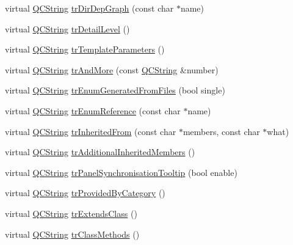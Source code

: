 \begin{DoxyCompactItemize}
\item 
virtual \mbox{\hyperlink{class_q_c_string}{Q\+C\+String}} \mbox{\hyperlink{class_translator_portuguese_aaa57e73413c0ebb8adaeb20c47b7d70d}{tr\+Dir\+Dep\+Graph}} (const char $\ast$name)
\item 
virtual \mbox{\hyperlink{class_q_c_string}{Q\+C\+String}} \mbox{\hyperlink{class_translator_portuguese_a29bd2f2c39e5cc12b1309dff04a21244}{tr\+Detail\+Level}} ()
\item 
virtual \mbox{\hyperlink{class_q_c_string}{Q\+C\+String}} \mbox{\hyperlink{class_translator_portuguese_a4e3b0375960c26203c9ded744c716fd0}{tr\+Template\+Parameters}} ()
\item 
virtual \mbox{\hyperlink{class_q_c_string}{Q\+C\+String}} \mbox{\hyperlink{class_translator_portuguese_a06f4476ad36b69307e44d514eef89c8f}{tr\+And\+More}} (const \mbox{\hyperlink{class_q_c_string}{Q\+C\+String}} \&number)
\item 
virtual \mbox{\hyperlink{class_q_c_string}{Q\+C\+String}} \mbox{\hyperlink{class_translator_portuguese_a8cfc21d957e46ece1bcceb4fc30a8755}{tr\+Enum\+Generated\+From\+Files}} (bool single)
\item 
virtual \mbox{\hyperlink{class_q_c_string}{Q\+C\+String}} \mbox{\hyperlink{class_translator_portuguese_a0dff38bef9093dc8ead3ea5f26027514}{tr\+Enum\+Reference}} (const char $\ast$name)
\item 
virtual \mbox{\hyperlink{class_q_c_string}{Q\+C\+String}} \mbox{\hyperlink{class_translator_portuguese_a26e0e11a91d2812d7c4ee065bf336ade}{tr\+Inherited\+From}} (const char $\ast$members, const char $\ast$what)
\item 
virtual \mbox{\hyperlink{class_q_c_string}{Q\+C\+String}} \mbox{\hyperlink{class_translator_portuguese_a9a260e90e0db549993e02438563e71f8}{tr\+Additional\+Inherited\+Members}} ()
\item 
virtual \mbox{\hyperlink{class_q_c_string}{Q\+C\+String}} \mbox{\hyperlink{class_translator_portuguese_abf7f7f02aa0e6facf94e3d09fe5db7a0}{tr\+Panel\+Synchronisation\+Tooltip}} (bool enable)
\item 
virtual \mbox{\hyperlink{class_q_c_string}{Q\+C\+String}} \mbox{\hyperlink{class_translator_portuguese_a21f69d47afa822f02c514cf8ebd79fdb}{tr\+Provided\+By\+Category}} ()
\item 
virtual \mbox{\hyperlink{class_q_c_string}{Q\+C\+String}} \mbox{\hyperlink{class_translator_portuguese_a96ea3065b37d2745866d70b83a4067b6}{tr\+Extends\+Class}} ()
\item 
virtual \mbox{\hyperlink{class_q_c_string}{Q\+C\+String}} \mbox{\hyperlink{class_translator_portuguese_ae486f9961399c366a846cfced46b2c3a}{tr\+Class\+Methods}} ()

\end{DoxyCompactItemize}
